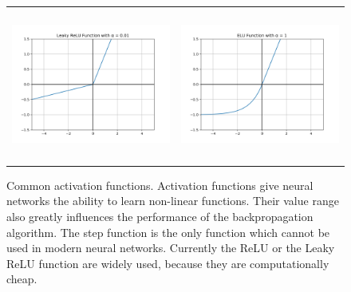 \begin{figure}[ht!]
\begin{center}
{\begin{tabular}{cc}
  \includegraphics[clip, height=5cm]{figures/deeplearning/af_LeakyReLU.png} & 
  \includegraphics[clip, height=5cm]{figures/deeplearning/af_ELU.png} \\
  
  \end{tabular}
  }%
  \end{center}
  \caption[Activation Functions]{Common activation functions. Activation functions give neural networks the ability to learn non-linear functions. Their value range also greatly influences the performance of the backpropagation algorithm. The step function is the only function which cannot be used in modern neural networks. Currently the ReLU or the Leaky ReLU function are widely used, because they are computationally cheap.}
  \label{fig:ActivationFunctions}
\end{figure}

